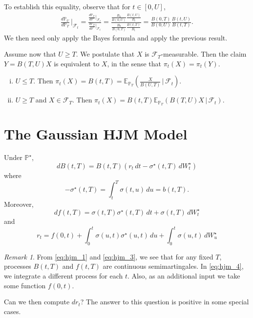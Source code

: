 \documentclass[10pt, oneside, reqno]{amsbook}
\theoremstyle{plain}%
\theoremstyle{definition}
\theoremstyle{remark}
\newtheorem*{rem}{Remark}
\newcommand{\given}{ \, | \,}
\newcommand{\sigf}{\mathcal{F}}
\newcommand{\E}{\mathbb{E}}
\renewcommand{\P}{\mathbb{P}}
\numberwithin{equation}{chapter}
\begin{document}
To establish this equality, observe that for $t \in [0, U]$, \begin{align*}
    \frac{d \P_U}{d \P_T} \, |_{\sigf_t} = \frac{ \frac{d\P_U}{d\P^\star} |_{\sigf_t}}{\frac{d\P_T}{d\P^\star} |_{\sigf_t}} = \frac{ \frac{B_0}{B(0, U)} \frac{B(t, U)}{B_t}}{\frac{B_0}{B(0, T)}\frac{B(t, T)}{B_t}} = \frac{B(0, T)}{B(0, U)}\frac{B(t, U)}{B(t, T)}.
\end{align*}  We then need only apply the Bayes formula and apply the previous result.

Assume now that $U \geq T$. We postulate that $X$ is $\sigf_T$-measurable. Then the claim $Y = B(T, U) X$ is equivalent to $X$, in the sense that $\pi_t(X) = \pi_t(Y)$.

\begin{enumerate}[(i)]
    \item $U \leq T$.  Then $\pi_t(X) = B(t, T) = \E_{\P_T} \left( \frac{X}{B(U, T)} \given \sigf_t \right)$.  
    \item $U \geq T$ and $X \in \sigf_T$.  Then $\pi_t(X) = B(t, T) \E_{\P_T} \left( B(T, U) X \given \sigf_t \right)$.
\end{enumerate}



\section{The Gaussian HJM Model} %
\label{sec:examples_of_hjm_models}
Under $\P^\star$, \begin{equation}
    \label{eq:hjm_1}
    dB(t, T) = B(t, T) \left(r_t \, dt - \sigma^\star(t, T) \, dW^\star_t \right)
\end{equation} where \begin{equation}
    \label{eq:hjm_2}
    -\sigma^\star(t, T) = \int_t^T \sigma(t, u) \, du = b(t, T).
\end{equation}  Moreover, \begin{equation}
    \label{eq:hjm_3}
    df(t, T) = \sigma(t, T) \sigma^\star(t, T) \, dt  + \sigma(t, T) \, dW^\star_t
\end{equation} and \begin{equation}
    \label{eq:hjm_4}
    r_t = f(0, t) + \int_0^t \sigma(u, t) \sigma^\star(u, t) \, du + \int_0^t \sigma(u, t) \, dW^\star_u
\end{equation} 

\begin{rem}
    From \eqref{eq:hjm_1} and \eqref{eq:hjm_3}, we see that for any fixed $T$, processes $B(t, T)$ and $f(t, T)$ are continuous semimartingales.  In \eqref{eq:hjm_4}, we integrate a different process for each $t$.  Also, as an additional input we take some function $f(0, t)$.
    
    Can we then compute $dr_t$?  The answer to this question is positive in some special cases.
\end{rem}
\end{document}
